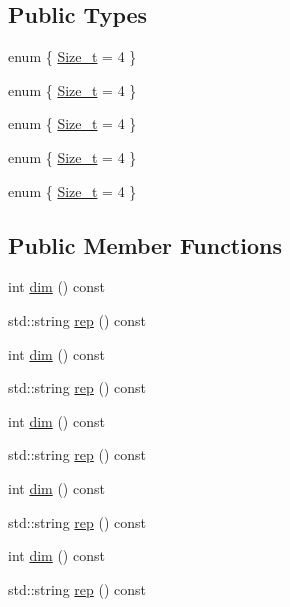 \subsection*{Public Types}
\begin{DoxyCompactItemize}
\item 
enum \{ \mbox{\hyperlink{structHadron_1_1J3o2Rep_ab05b53841aa6e37fccbf42c95c64d8e9a7310ff2bbe90c48e5d307cd3adc0b46e}{Size\+\_\+t}} = 4
 \}
\item 
enum \{ \mbox{\hyperlink{structHadron_1_1J3o2Rep_ab05b53841aa6e37fccbf42c95c64d8e9a7310ff2bbe90c48e5d307cd3adc0b46e}{Size\+\_\+t}} = 4
 \}
\item 
enum \{ \mbox{\hyperlink{structHadron_1_1J3o2Rep_ab05b53841aa6e37fccbf42c95c64d8e9a7310ff2bbe90c48e5d307cd3adc0b46e}{Size\+\_\+t}} = 4
 \}
\item 
enum \{ \mbox{\hyperlink{structHadron_1_1J3o2Rep_ab05b53841aa6e37fccbf42c95c64d8e9a7310ff2bbe90c48e5d307cd3adc0b46e}{Size\+\_\+t}} = 4
 \}
\item 
enum \{ \mbox{\hyperlink{structHadron_1_1J3o2Rep_ab05b53841aa6e37fccbf42c95c64d8e9a7310ff2bbe90c48e5d307cd3adc0b46e}{Size\+\_\+t}} = 4
 \}
\end{DoxyCompactItemize}
\subsection*{Public Member Functions}
\begin{DoxyCompactItemize}
\item 
int \mbox{\hyperlink{structHadron_1_1J3o2Rep_a119556341b3fb8bfb4615b3798973c9c}{dim}} () const
\item 
std\+::string \mbox{\hyperlink{structHadron_1_1J3o2Rep_a4284616b9bdc9582f085ab1b60a15f1d}{rep}} () const
\item 
int \mbox{\hyperlink{structHadron_1_1J3o2Rep_a119556341b3fb8bfb4615b3798973c9c}{dim}} () const
\item 
std\+::string \mbox{\hyperlink{structHadron_1_1J3o2Rep_a4284616b9bdc9582f085ab1b60a15f1d}{rep}} () const
\item 
int \mbox{\hyperlink{structHadron_1_1J3o2Rep_a119556341b3fb8bfb4615b3798973c9c}{dim}} () const
\item 
std\+::string \mbox{\hyperlink{structHadron_1_1J3o2Rep_a4284616b9bdc9582f085ab1b60a15f1d}{rep}} () const
\item 
int \mbox{\hyperlink{structHadron_1_1J3o2Rep_a119556341b3fb8bfb4615b3798973c9c}{dim}} () const
\item 
std\+::string \mbox{\hyperlink{structHadron_1_1J3o2Rep_a4284616b9bdc9582f085ab1b60a15f1d}{rep}} () const
\item 
int \mbox{\hyperlink{structHadron_1_1J3o2Rep_a119556341b3fb8bfb4615b3798973c9c}{dim}} () const
\item 
std\+::string \mbox{\hyperlink{structHadron_1_1J3o2Rep_a4284616b9bdc9582f085ab1b60a15f1d}{rep}} () const
\end{DoxyCompactItemize}


